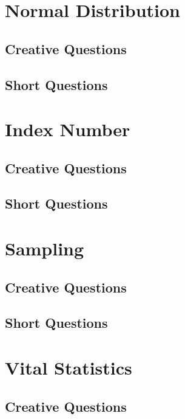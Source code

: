 \documentclass[a4paper,oneside, margin=1.4in]{book}
\begin{document}
\chapter{Normal Distribution} 
\section{Creative Questions}


\section{Short Questions}

\chapter{Index Number} 
\section{Creative Questions}


\section{Short Questions}

\chapter{Sampling} 
\section{Creative Questions}


\section{Short Questions}

\chapter{Vital Statistics} 
\section{Creative Questions}
\end{document}
